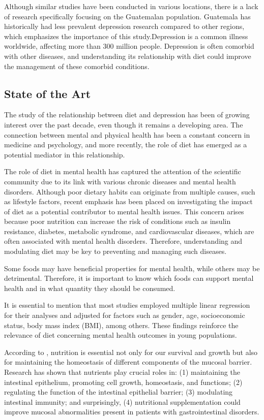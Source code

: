 \documentclass[jou]{apa7}
\begin{document}
	Although similar studies have been conducted in various locations, there is a lack of research specifically focusing on the Guatemalan population. Guatemala has historically had less prevalent depression research compared to other regions, which emphasizes the importance of this study.Depression is a common illness worldwide, affecting more than 300 million people. Depression is often comorbid with other diseases, and understanding its relationship with diet could improve the management of these comorbid conditions. 



\subsection{State of the Art}

The study of the relationship between diet and depression has been of growing interest over the past decade, even though it remains a developing area. The connection between mental and physical health has been a constant concern in medicine and psychology, and more recently, the role of diet has emerged as a potential mediator in this relationship.

The role of diet in mental health has captured the attention of the scientific community due to its link with various chronic diseases and mental health disorders. Although poor dietary habits can originate from multiple causes, such as lifestyle factors, recent emphasis has been placed on investigating the impact of diet as a potential contributor to mental health issues. This concern arises because poor nutrition can increase the risk of conditions such as insulin resistance, diabetes, metabolic syndrome, and cardiovascular diseases, which are often associated with mental health disorders. Therefore, understanding and modulating diet may be key to preventing and managing such diseases.

Some foods may have beneficial properties for mental health, while others may be detrimental. Therefore, it is important to know which foods can support mental health and in what quantity they should be consumed.

It is essential to mention that most studies employed multiple linear regression for their analyses and adjusted for factors such as gender, age, socioeconomic status, body mass index (BMI), among others. These findings reinforce the relevance of diet concerning mental health outcomes in young populations.

According to \parencite{Farre2020}, nutrition is essential not only for our survival and growth but also for maintaining the homeostasis of different components of the mucosal barrier. Research has shown that nutrients play crucial roles in: (1) maintaining the intestinal epithelium, promoting cell growth, homeostasis, and functions; (2) regulating the function of the intestinal epithelial barrier; (3) modulating intestinal immunity; and surprisingly, (4) nutritional supplementation could improve mucosal abnormalities present in patients with gastrointestinal disorders.
\end{document}
